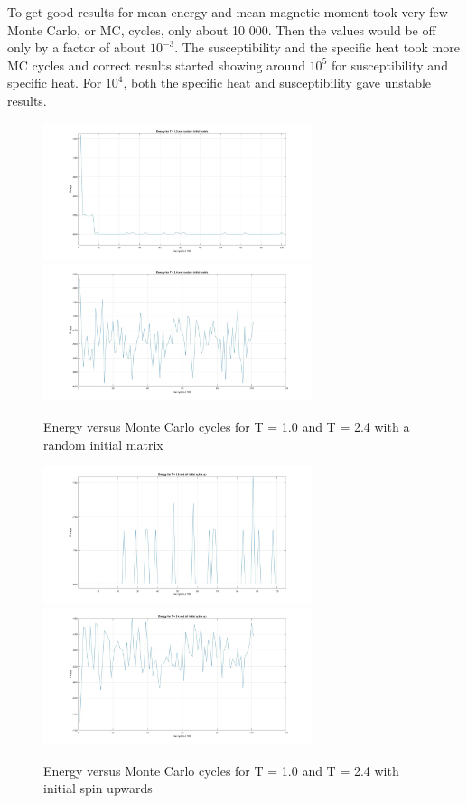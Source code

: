 \documentclass[10pt,a4paper]{article}
\begin{document}
\noindent To get good results for mean energy and mean magnetic moment took very few Monte Carlo, or MC, cycles, only about 10 000. Then the values would be off only by a factor of about $10^{-3}$. The susceptibility and the specific heat took more MC cycles and correct results started showing around $10^{5}$ for susceptibility and specific heat. For $10^4$, both the specific heat and susceptibility gave unstable results.

\begin{figure}[H]
\centerline{
\includegraphics[width=0.7\textwidth]{energyT1random}
\includegraphics[width=0.7\textwidth]{energyT24random}
}
\caption{Energy versus Monte Carlo cycles for T = 1.0 and T = 2.4 with a random initial matrix}
\label{fig:energyrandom}
\end{figure}

\begin{figure}[H]
\centerline{
\includegraphics[width=0.7\textwidth]{energyT1upspin}
\includegraphics[width=0.7\textwidth]{energyT24upspin}
}
\caption{Energy versus Monte Carlo cycles for T = 1.0 and T = 2.4 with initial spin upwards}
\label{fig:energyupspin}
\end{figure}
\end{document}
